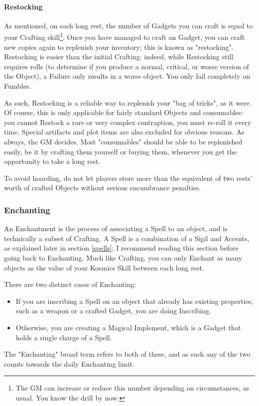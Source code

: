 \paragraph{Restocking}

As mentioned, on each long rest, the number of Gadgets you can craft is equal to your Crafting skill\footnote{The GM can increase or reduce this number depending on circumstances, as usual. You know the drill by now.}. Once you have managed to craft an Gadget, you can craft new copies again to replenish your inventory; this is known as "restocking". Restocking is easier than the initial Crafting: indeed, while Restocking still requires rolls (to determine if you produce a normal, critical, or worse version of the Object), a Failure only results in a worse object. You only fail completely on Fumbles.

As such, Restocking is a reliable way to replenish your "bag of tricks", as it were. Of course, this is only applicable for fairly standard Objects and consumables: you cannot Restock a rare or very complex contraption, you must re-roll it every time. Special artifacts and plot items are also excluded for obvious reasons. As always, the GM decides. Most "consumables" should be able to be replenished easily, be it by crafting them yourself or buying them, whenever you get the opportunity to take a long rest. 

To avoid hoarding, do not let players store more than the equivalent of two rests' worth of crafted Objects without serious encumbrance penalties.

\subsubsection{Enchanting}



\label{enchanting}

An Enchantment is the process of associating a Spell to an object, and is technically a subset of Crafting. A Spell is a combination of a Sigil and Accents, as explained later in section \ref{spells}; I recommend reading this section before going back to Enchanting. Much like Crafting, you can only Enchant as many objects as the value of your Kosmics Skill between each long rest.

There are two distinct cases of Enchanting:
\begin{itemize}
	\item If you are inscribing a Spell on an object that already has existing properties, such as a weapon or a crafted Gadget, you are doing Inscribing.
	\item Otherwise, you are creating a Magical Implement, which is a Gadget that holds a single charge of a Spell.
\end{itemize}
The "Enchanting" broad term refers to both of these, and as such any of the two counts towards the daily Enchanting limit.

